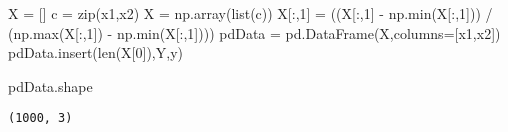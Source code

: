 \documentclass[
]{article}
\newenvironment{Shaded}{}{}
\newcommand{\BuiltInTok}[1]{#1}
\newcommand{\DecValTok}[1]{\textcolor[rgb]{0.25,0.63,0.44}{#1}}
\newcommand{\NormalTok}[1]{#1}
\newcommand{\OperatorTok}[1]{\textcolor[rgb]{0.40,0.40,0.40}{#1}}
\newcommand{\StringTok}[1]{\textcolor[rgb]{0.25,0.44,0.63}{#1}}
\begin{document}
\begin{Shaded}
\begin{Highlighting}[]
\NormalTok{X }\OperatorTok{=}\NormalTok{ []}
\NormalTok{c }\OperatorTok{=} \BuiltInTok{zip}\NormalTok{(x1,x2)}
\NormalTok{X }\OperatorTok{=}\NormalTok{ np.array(}\BuiltInTok{list}\NormalTok{(c))}
\NormalTok{X[:,}\DecValTok{1}\NormalTok{] }\OperatorTok{=}\NormalTok{ ((X[:,}\DecValTok{1}\NormalTok{] }\OperatorTok{{-}}\NormalTok{ np.}\BuiltInTok{min}\NormalTok{(X[:,}\DecValTok{1}\NormalTok{])) }\OperatorTok{/}\NormalTok{ (np.}\BuiltInTok{max}\NormalTok{(X[:,}\DecValTok{1}\NormalTok{]) }\OperatorTok{{-}}\NormalTok{ np.}\BuiltInTok{min}\NormalTok{(X[:,}\DecValTok{1}\NormalTok{])))}
\NormalTok{pdData }\OperatorTok{=}\NormalTok{ pd.DataFrame(X,columns}\OperatorTok{=}\NormalTok{[}\StringTok{\textquotesingle{}x1\textquotesingle{}}\NormalTok{,}\StringTok{\textquotesingle{}x2\textquotesingle{}}\NormalTok{])}
\NormalTok{pdData.insert(}\BuiltInTok{len}\NormalTok{(X[}\DecValTok{0}\NormalTok{]),}\StringTok{\textquotesingle{}Y\textquotesingle{}}\NormalTok{,y)}
\end{Highlighting}
\end{Shaded}

\begin{Shaded}
\begin{Highlighting}[]
\NormalTok{pdData.shape}
\end{Highlighting}
\end{Shaded}

\begin{verbatim}
(1000, 3)
\end{verbatim}
\end{document}
